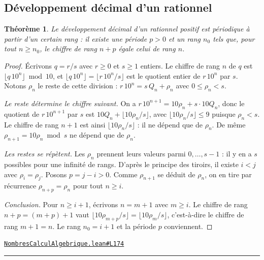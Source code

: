 \documentclass[11pt,a4paper]{article}
\theoremstyle{definition}
\theoremstyle{plain}
\newtheorem{theoreme}{Théorème}
\newcommand{\source}[2]{\par\smallskip\noindent\hfill{\footnotesize\href{#1}{\texttt{#2}}}\par\smallskip}
\begin{document}
\subsection{Développement décimal d'un rationnel}

\begin{theoreme}
Le développement décimal d'un rationnel positif est périodique à partir d'un certain
rang : il existe une période $p > 0$ et un rang $n_0$ tels que, pour tout $n \ge n_0$, le
chiffre de rang $n + p$ égale celui de rang $n$.
\end{theoreme}
\begin{proof}
Écrivons $q = r/s$ avec $r \ge 0$ et $s \ge 1$ entiers. Le chiffre de rang $n$ de $q$ est
$\lfloor q\,10^n \rfloor \bmod 10$, et $\lfloor q\,10^n \rfloor = \lfloor r\,10^n / s \rfloor$
est le quotient entier de $r\,10^n$ par $s$. Notons $\rho_n$ le reste de cette division :
$r\,10^n = s\,Q_n + \rho_n$ avec $0 \le \rho_n < s$.

\emph{Le reste détermine le chiffre suivant.} On a $r\,10^{n+1} = 10\rho_n + s \cdot 10 Q_n$,
donc le quotient de $r\,10^{n+1}$ par $s$ est $10 Q_n + \lfloor 10\rho_n / s \rfloor$, avec
$\lfloor 10\rho_n / s \rfloor \le 9$ puisque $\rho_n < s$. Le chiffre de rang $n+1$ est ainsi
$\lfloor 10\rho_n / s \rfloor$ : il ne dépend que de $\rho_n$. De même
$\rho_{n+1} = 10\rho_n \bmod s$ ne dépend que de $\rho_n$.

\emph{Les restes se répètent.} Les $\rho_n$ prennent leurs valeurs parmi $0, \dots, s-1$ :
il y en a $s$ possibles pour une infinité de rangs. D'après le principe des tiroirs, il existe
$i < j$ avec $\rho_i = \rho_j$. Posons $p = j - i > 0$. Comme $\rho_{n+1}$ se déduit de $\rho_n$,
on en tire par récurrence $\rho_{n+p} = \rho_n$ pour tout $n \ge i$.

\emph{Conclusion.} Pour $n \ge i + 1$, écrivons $n = m + 1$ avec $m \ge i$. Le chiffre de rang
$n + p = (m + p) + 1$ vaut $\lfloor 10\rho_{m+p}/s \rfloor = \lfloor 10\rho_m / s \rfloor$, c'est-à-dire
le chiffre de rang $m + 1 = n$. Le rang $n_0 = i + 1$ et la période $p$ conviennent.
\end{proof}
\source{https://github.com/Commutator-IO/learn-lean/blob/main/courses/02-lycee/01-nombres-calcul-algebrique/NombresCalculAlgebrique.lean\#L174}{NombresCalculAlgebrique.lean\#L174}

\vfill
\noindent\rule{0.35\linewidth}{0.4pt}\par
{}
\end{document}

